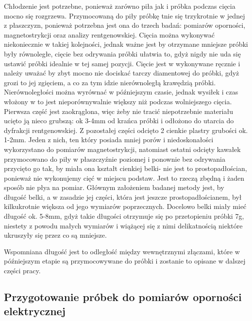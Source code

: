 \documentclass[a4paper,12pt]{article}
\numberwithin{equation}{section}
\begin{document}
Chłodzenie jest potrzebne, ponieważ 
zarówno piła jak i próbka podczas cięcia mocno się rozgrzewa. Przymocowaną do piły próbkę tnie się 
trzykrotnie w jednej z płaszczyzn, ponieważ potrzebna jest ona do trzech badań: pomiarów oporności, 
magnetostrykcji oraz analizy rentgenowskiej. Cięcia można wykonywać niekoniecznie w takiej kolejności, 
jednak  ważne jest by otrzymane mniejsze próbki były  równoległe, cięcie bez odrywania próbki ułatwia to, 
gdyż nigdy nie uda się ustawić próbki 
idealnie w tej samej pozycji. Cięcie jest w wykonywane ręcznie i należy uważać by zbyt mocno nie dociskać 
tarczy diamentowej do próbki, gdyż grozi to jej zgięciem, a co za tym idzie nierównoległą krawędzią próbki. 
Nierównoległości można wyrównać w późniejszym czasie, jednak wysiłek i czas włożony w to jest 
nieporównywalnie większy niż podczas wolniejszego cięcia. Pierwsza część jest zaokrąglona, więc żeby nie 
tracić niepotrzebnie materiału ucięto ją nieco grubszą: ok 3-4mm od krańca próbki i odłożono do utarcia do 
dyfrakcji rentgenowskiej. Z pozostałej części odcięto 2 cienkie plastry grubości ok. 1-2mm. Jeden z nich, ten 
który posiada mniej porów i niedoskonałości wykorzystano do pomiarów magnetostrykcji, natomiast ostatni 
odcięty kawałek przymocowano do piły w płaszczyźnie poziomej i ponownie bez odrywania przycięto go tak, by 
miała ona kształt cienkiej belki- nie jest to prostopadłościan, ponieważ nie wykonujemy cięć w miejscu 
podstaw. Jest to rzeczą zbędną i  żaden sposób nie płya na pomiar. Głównym założeniem badanej metody jest, by długość belki, a w zasadzie jej 
części, która jest jeszcze prostopadłościanem, był kilkukrotnie większa od jego wymiarów poprzecznych. 
Docelowo belki miały mieć długość ok. 5-8mm, gdyż takie długości otrzymuje się po przetopieniu próbki 7g, 
niestety z powodu małych wymiarów i wiążącej się z nimi delikatnością niektóre ukruszyły się przez co są mniejsze. 

Wspomniana długość jest to odległość między wewnętrznymi złączami, które w późniejszym etapie są 
przymocowywane do próbki i zostanie to opisane w dalszej części pracy. 






\subsection{Przygotowanie próbek do pomiarów oporności elektrycznej}
\end{document}
